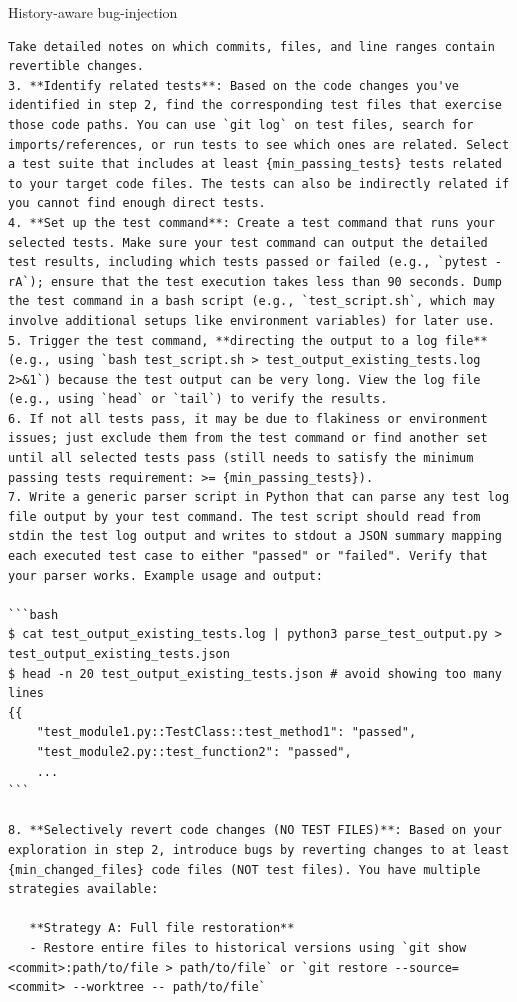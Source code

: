 \begin{promptbox}{History-aware bug-injection}
\begin{Verbatim}[breaklines=true]
   Take detailed notes on which commits, files, and line ranges contain revertible changes.
3. **Identify related tests**: Based on the code changes you've identified in step 2, find the corresponding test files that exercise those code paths. You can use `git log` on test files, search for imports/references, or run tests to see which ones are related. Select a test suite that includes at least {min_passing_tests} tests related to your target code files. The tests can also be indirectly related if you cannot find enough direct tests.
4. **Set up the test command**: Create a test command that runs your selected tests. Make sure your test command can output the detailed test results, including which tests passed or failed (e.g., `pytest -rA`); ensure that the test execution takes less than 90 seconds. Dump the test command in a bash script (e.g., `test_script.sh`, which may involve additional setups like environment variables) for later use.
5. Trigger the test command, **directing the output to a log file** (e.g., using `bash test_script.sh > test_output_existing_tests.log 2>&1`) because the test output can be very long. View the log file (e.g., using `head` or `tail`) to verify the results.
6. If not all tests pass, it may be due to flakiness or environment issues; just exclude them from the test command or find another set until all selected tests pass (still needs to satisfy the minimum passing tests requirement: >= {min_passing_tests}).
7. Write a generic parser script in Python that can parse any test log file output by your test command. The test script should read from stdin the test log output and writes to stdout a JSON summary mapping each executed test case to either "passed" or "failed". Verify that your parser works. Example usage and output:

```bash
$ cat test_output_existing_tests.log | python3 parse_test_output.py > test_output_existing_tests.json
$ head -n 20 test_output_existing_tests.json # avoid showing too many lines
{{
    "test_module1.py::TestClass::test_method1": "passed",
    "test_module2.py::test_function2": "passed",
    ...
```

8. **Selectively revert code changes (NO TEST FILES)**: Based on your exploration in step 2, introduce bugs by reverting changes to at least {min_changed_files} code files (NOT test files). You have multiple strategies available:

   **Strategy A: Full file restoration**
   - Restore entire files to historical versions using `git show <commit>:path/to/file > path/to/file` or `git restore --source=<commit> --worktree -- path/to/file`


\end{Verbatim}
\end{promptbox}
